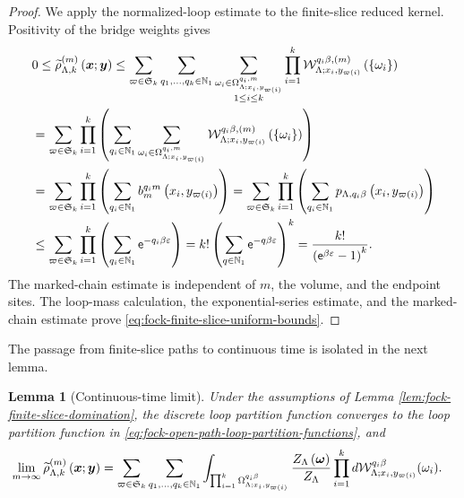 \documentclass[11pt,a4paper]{article}
\theoremstyle{plain}
\newtheorem{lem}[thm]{Lemma}
\theoremstyle{definition}
\theoremstyle{remark}
\begin{document}
\begin{proof}
We apply the normalized-loop estimate to the finite-slice reduced kernel.
Positivity of the bridge weights gives
$$\begin{aligned}
&
0
\leq
\fun{\widetilde{\rho}_{\Lambda,k}^{(m)}}{\boldsymbol{x};\boldsymbol{y}}
\leq
\sum_{\varpi \in \grsym{k}}
\sum_{q_1,\ldots,q_k \in \semigrposint}
\sum_{\substack{
\omega_i \in \Omega_{\Lambda;x_i,y_{\fun{\varpi}{i}}}^{q_i,m}\\
1 \leq i \leq k}}
\prod_{i = 1}^{k}
\fun{\msrcal{W}_{\Lambda;x_i,y_{\fun{\varpi}{i}}}^{q_i\beta,(m)}}{\setone{\omega_i}}
\\ %
& =
\sum_{\varpi \in \grsym{k}}
\prod_{i = 1}^{k}
\rbk{
\sum_{q_i \in \semigrposint}
\sum_{\omega_i \in \Omega_{\Lambda;x_i,y_{\fun{\varpi}{i}}}^{q_i,m}}
\fun{\msrcal{W}_{\Lambda;x_i,y_{\fun{\varpi}{i}}}^{q_i\beta,(m)}}{\setone{\omega_i}}}
\\ %
& =
\sum_{\varpi \in \grsym{k}}
\prod_{i = 1}^{k}
\rbk{
\sum_{q_i \in \semigrposint}
\fun{b_m^{q_i m}}{x_i,y_{\fun{\varpi}{i}}}}
=
\sum_{\varpi \in \grsym{k}}
\prod_{i = 1}^{k}
\rbk{
\sum_{q_i \in \semigrposint}
\fun{p_{\Lambda,q_i\beta}}{x_i,y_{\fun{\varpi}{i}}}}
\\
& \leq
\sum_{\varpi \in \grsym{k}}
\prod_{i = 1}^{k}
\rbk{
\sum_{q_i \in \semigrposint}
\napiernum^{-q_i\beta\varepsilon}}
=
k!
\rbk{
\sum_{q \in \semigrposint}
\napiernum^{-q\beta\varepsilon}}^{k}
=
\frac{k!}{\rbk{\napiernum^{\beta\varepsilon}-1}^{k}}.
\end{aligned}$$
The marked-chain estimate is independent of $m$, the volume, and the endpoint sites.
The loop-mass calculation, the exponential-series estimate, and the marked-chain estimate prove
\eqref{eq:fock-finite-slice-uniform-bounds}.
\end{proof}

The passage from finite-slice paths to continuous time is isolated in the next lemma.

\begin{lem}[Continuous-time limit]\label{lem:fock-continuous-time-limit}
Under the assumptions of Lemma \ref{lem:fock-finite-slice-domination}, the discrete loop partition function
converges to the loop partition function in \eqref{eq:fock-open-path-loop-partition-functions}, and
\begin{equation}
\begin{aligned}
\lim_{m\to\infty}
\fun{\widetilde{\rho}_{\Lambda,k}^{(m)}}{\boldsymbol{x};\boldsymbol{y}}
& =
\sum_{\varpi \in \grsym{k}}
\sum_{q_1,\ldots,q_k \in \semigrposint}
\int_{\prod_{i = 1}^{k}\Omega_{\Lambda;x_i,y_{\fun{\varpi}{i}}}^{q_i\beta}}
\frac{\fun{Z_{\Lambda}}{\boldsymbol{\omega}}}{Z_{\Lambda}}
\prod_{i = 1}^{k}
\opdmsr{\msrcal{W}_{\Lambda;x_i,y_{\fun{\varpi}{i}}}^{q_i\beta}}(\omega_i).
\end{aligned}
\label{eq:fock-continuous-time-open-path-limit}
\end{equation}
\end{lem}
\end{document}
